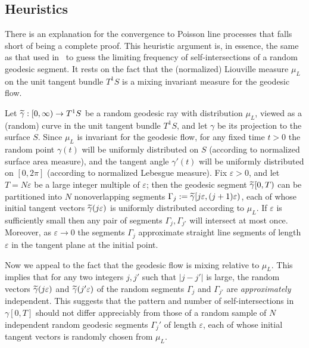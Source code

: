 \documentclass[10pt]{amsart}
\theoremstyle{definition}\newtheorem{defi}[theo]{Definition}\newtheorem{rema}[theo]{Remark}\newtheorem{exam}[theo]{Example}\newtheorem{exem}[theo]{Example}\newtheorem{nota}[theo]{Notation}
\let\oldtilde\tilde
\renewcommand*{\tilde}[1]{\mathchoice{\widetilde{#1}}{\widetilde{#1}}{\oldtilde{#1}}{\oldtilde{#1}}}\let\oldforall\forall
\renewcommand*{\forall}{\mathrel{\oldforall}}
\begin{document}
\subsection{Heuristics}\label{ssec:heuristics}
There is an explanation for the convergence to Poisson line processes that falls short of being a complete proof. This heuristic argument is, in essence, the same as that used in~\cite{lalley:si1} to guess the limiting frequency of self-intersections of a random geodesic segment. It rests on the fact that the (normalized) Liouville measure $\mu_{L}$ on the unit tangent bundle $T^{1}S$ is a mixing invariant measure for the geodesic flow.

Let $\tilde{\gamma} : [0,\infty) \rightarrow T^{1}S$ be a random geodesic ray with distribution $\mu_{L}$, viewed as a (random) curve in the unit tangent bundle $T^{1}S$, and let $\gamma$ be its projection to the surface $S$. Since $\mu_{L}$ is invariant for the geodesic flow, for any fixed time $t>0$ the random point $\gamma(t)$ will be uniformly distributed on $S$ (according to normalized surface area measure), and the tangent angle ${\gamma}'(t)$ will be uniformly distributed on $[0, 2\pi]$ (according to normalized Lebesgue measure). Fix $\varepsilon >0$, and let $T=N\varepsilon$ be a large integer multiple of $\varepsilon$; then the geodesic segment $\tilde{\gamma}[0,T)$ can be partitioned into $N$ nonoverlapping segments $\Gamma_{j}:=\tilde{\gamma}[j\varepsilon, (j+1)\varepsilon)$, each of whose initial tangent vectors $\tilde{\gamma}(j\varepsilon)$ is uniformly distributed according to $\mu_{L}$. If $\varepsilon$ is sufficiently small then any pair of segments $\Gamma_{j}, \Gamma_{j'}$ will intersect at most once. Moreover, as $\varepsilon \rightarrow 0$ the segments $\Gamma_{j}$ approximate straight line segments of length $\varepsilon $ in the tangent plane at the initial point.

Now we appeal to the fact that the geodesic flow is mixing relative to $\mu_{L}$. This implies that for any two integers $j,j'$ such that $|j-j'|$ is large, the random vectors $\tilde{\gamma}(j \varepsilon)$ and $\tilde{\gamma}(j' \varepsilon)$ of the random segments $\Gamma_{j}$ and $\Gamma_{j'}$ are \emph{approximately} independent. This suggests that the pattern and number of self-intersections in $\gamma[0,T]$ should not differ appreciably from those of a random sample of $N$ independent random geodesic segments $\Gamma_{j}'$ of length $\varepsilon$, each of whose initial tangent vectors is randomly chosen from $\mu_{L}$.
\end{document}
